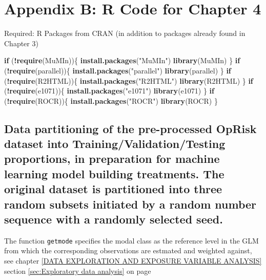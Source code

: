\documentclass[
]{article}
\author{}
\date{\vspace{-2.5em}}
\newenvironment{Shaded}{\begin{snugshade}}{\end{snugshade}}
\newcommand{\ControlFlowTok}[1]{\textcolor[rgb]{0.13,0.29,0.53}{\textbf{#1}}}
\newcommand{\KeywordTok}[1]{\textcolor[rgb]{0.13,0.29,0.53}{\textbf{#1}}}
\newcommand{\NormalTok}[1]{#1}
\newcommand{\OperatorTok}[1]{\textcolor[rgb]{0.81,0.36,0.00}{\textbf{#1}}}
\newcommand{\StringTok}[1]{\textcolor[rgb]{0.31,0.60,0.02}{#1}}
\begin{document}
\section{Appendix B: R Code for Chapter 4}
\label{sec:Appendix B: R Code for Chapter 4}

\singlespace

Required: R Packages from CRAN (in addition to packages already found in
Chapter 3)

\small

\begin{Shaded}
\begin{Highlighting}[]
\ControlFlowTok{if}\NormalTok{ (}\OperatorTok{!}\KeywordTok{require}\NormalTok{(MuMIn))\{}
  \KeywordTok{install.packages}\NormalTok{(}\StringTok{"MuMIn"}\NormalTok{)}
  \KeywordTok{library}\NormalTok{(MuMIn)}
\NormalTok{\}}
\ControlFlowTok{if}\NormalTok{ (}\OperatorTok{!}\KeywordTok{require}\NormalTok{(parallel))\{}
  \KeywordTok{install.packages}\NormalTok{(}\StringTok{"parallel"}\NormalTok{)}
  \KeywordTok{library}\NormalTok{(parallel)}
\NormalTok{\}}
\ControlFlowTok{if}\NormalTok{ (}\OperatorTok{!}\KeywordTok{require}\NormalTok{(R2HTML))\{}
  \KeywordTok{install.packages}\NormalTok{(}\StringTok{"R2HTML"}\NormalTok{)}
  \KeywordTok{library}\NormalTok{(R2HTML)}
\NormalTok{\}}
\ControlFlowTok{if}\NormalTok{ (}\OperatorTok{!}\KeywordTok{require}\NormalTok{(e1071))\{}
  \KeywordTok{install.packages}\NormalTok{(}\StringTok{"e1071"}\NormalTok{)}
  \KeywordTok{library}\NormalTok{(e1071)}
\NormalTok{\}}
\ControlFlowTok{if}\NormalTok{ (}\OperatorTok{!}\KeywordTok{require}\NormalTok{(ROCR))\{}
  \KeywordTok{install.packages}\NormalTok{(}\StringTok{"ROCR"}\NormalTok{)}
  \KeywordTok{library}\NormalTok{(ROCR)}
\NormalTok{\}}
\end{Highlighting}
\end{Shaded}

\normalsize

\subsection{Data partitioning of the pre-processed OpRisk dataset into Training/Validation/Testing proportions, in preparation for machine learning model building treatments. The original dataset is partitioned into three random subsets initiated by a random number sequence with a randomly selected seed.}
\label{ssec:Data Training/Validation/Testing}

The function \texttt{getmode} specifies the modal class as the reference
level in the GLM from which the corresponding observations are estmated
and weighted against, see chapter
\ref{DATA EXPLORATION AND EXPOSURE VARIABLE ANALYSIS} section
\ref{sec:Exploratory data analysis} on page
\pageref{sec:Exploratory data analysis}
\end{document}
